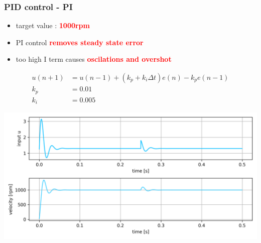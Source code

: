 \documentclass{beamer}
\begin{document}
\begin{frame}
  
  \frametitle{\bf PID control - PI}

  \begin{itemize}
    \item  target value : \textcolor{red}{\bf 1000rpm}
    \item  PI control \textcolor{red}{\bf removes steady state error}
    \item  too high I term causes \textcolor{red}{\bf oscilations and overshot}
  \end{itemize}

  \begin{align*}
    u(n+1) &= u(n-1) + (k_p + k_i\Delta t) e(n) - k_pe(n-1) \\
    k_p    &= 0.01 \\
    k_i    &= 0.005
  \end{align*}

  {\centering \includegraphics[scale=0.4]{../images/motor_control/pid_pi_control_0.png}}

\end{frame}
\end{document}
